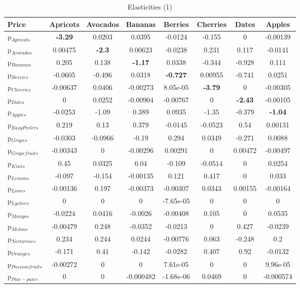 \documentclass[11pt]{article}
\begin{document}
\begin{table}[h]
\caption{Elasticities (1)}
\label{table:elasticities 1}
\begin{center}
\begin{tabular}{lccccccc} \hline \hline
Price &Apricots &Avocados &Bananas &Berries &Cherries &Dates &Apples \\ \hline
p$_{Apricots}$ &\textbf{-3.29} &0.0203 &0.0395 &-0.0124 &-0.155 &0 &-0.00139 \\
p$_{Avocados}$ &0.00475 &\textbf{-2.3} &0.00623 &-0.0238 &0.231 &0.117 &-0.0141 \\
p$_{Bananas}$ &0.205 &0.138 &\textbf{-1.17} &0.0338 &-0.344 &-0.928 &0.111 \\
p$_{Berries}$ &-0.0605 &-0.496 &0.0318 &\textbf{-0.727} &0.00955 &-0.741 &0.0251 \\
p$_{Cherries}$ &-0.00637 &0.0406 &-0.00273 &8.05e-05 &\textbf{-3.79} &0 &-0.00305 \\
p$_{Dates}$ &0 &0.0252 &-0.00904 &-0.00767 &0 &\textbf{-2.43} &-0.00105 \\
p$_{Apples}$ &-0.0253 &-1.09 &0.389 &0.0935 &-1.35 &-0.379 &\textbf{-1.04} \\
p$_{Easy Peelers}$ &0.219 &0.13 &0.379 &-0.0145 &-0.0523 &0.54 &0.00131 \\
p$_{Grapes}$ &-0.0303 &-0.0966 &-0.19 &0.294 &0.0349 &-0.271 &0.0088 \\
p$_{Grapefruits}$ &-0.00343 &0 &-0.00296 &0.00291 &0 &0.00472 &-0.00497 \\
p$_{Kiwis}$ &0.45 &0.0325 &0.04 &-0.109 &-0.0514 &0 &0.0254 \\
p$_{Lemons}$ &-0.097 &-0.154 &-0.00135 &0.121 &0.417 &0 &0.033 \\
p$_{Limes}$ &-0.00136 &0.197 &-0.00373 &-0.00307 &0.0343 &0.00155 &-0.00164 \\
p$_{Lychees}$ &0 &0 &0 &-7.65e-05 &0 &0 &0 \\
p$_{Mangos}$ &-0.0224 &0.0416 &-0.0026 &-0.00408 &0.105 &0 &0.0535 \\
p$_{Melons}$ &-0.00479 &0.248 &-0.0352 &-0.0213 &0 &0.427 &-0.0239 \\
p$_{Nectarines}$ &0.234 &0.244 &0.0244 &-0.00776 &0.063 &-0.248 &0.2 \\
p$_{Oranges}$ &-0.171 &0.41 &-0.142 &-0.0282 &0.407 &0.92 &-0.0132 \\
p$_{Passion fruits}$ &-0.00272 &0 &0 &7.61e-05 &0 &0 &9.96e-05 \\
p$_{Paw-paws}$ &0 &0 &-0.000482 &-1.68e-06 &0.0469 &0 &-0.000574 \\

\end{tabular}
\end{center}
\end{table}
\end{document}
